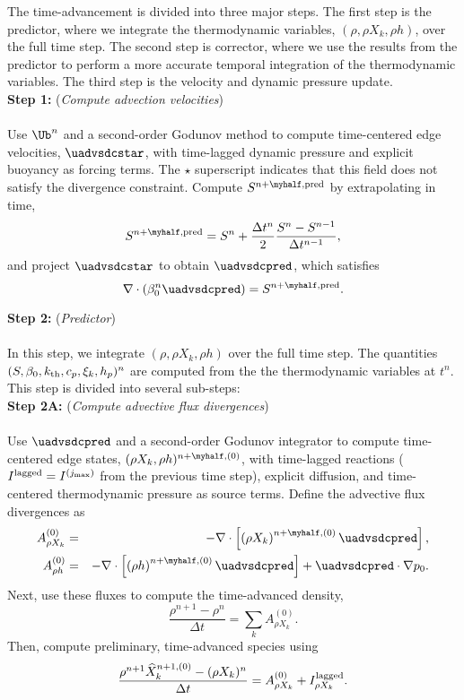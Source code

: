 The time-advancement is divided into three major steps.  The first step is the predictor, where we integrate the thermodynamic variables, $(\rho,\rho X_k,\rho h)$, over the full time step.  The second step is corrector, where we use the results from the predictor to perform a more accurate temporal integration of the thermodynamic variables.  The third step is the velocity and dynamic pressure update.\\

{\bf Step 1:} ({\it Compute advection velocities})\\ \\
Use $\Ub^n$ and a second-order Godunov method to compute time-centered edge velocities, $\uadvsdcstar$, with time-lagged dynamic pressure and explicit buoyancy as forcing terms.  The $\star$ superscript indicates that this field does not satisfy the divergence constraint.  Compute $S^{n+\myhalf,{\rm pred}}$ by extrapolating in time,
\begin{equation}
S^{n+\myhalf,{\rm pred}} = S^n + \frac{\Delta t^n}{2}\frac{S^n - S^{n-1}}{\Delta t^{n-1}},
\end{equation}
and project $\uadvsdcstar$ to obtain $\uadvsdcpred$, which satisfies
\begin{equation}
\nabla\cdot\left(\beta_0^n\uadvsdcpred\right) = S^{n+\myhalf,\rm{pred}}.
\end{equation}

{\bf Step 2:} ({\it Predictor})\\ \\
 In this step, we integrate $(\rho, \rho X_k, \rho h)$ over the full time step.  The quantities $(S, \beta_0, k_{\rm th}, c_p, \xi_k, h_p)^n$ are computed from the the thermodynamic variables at $t^n$.  This step is divided into several sub-steps:\\

{\bf Step 2A:} ({\it Compute advective flux divergences})\\ \\
Use $\uadvsdcpred$ and a second-order Godunov integrator to compute time-centered edge states, $(\rho X_k, \rho h)^{n+\myhalf,(0)}$, with time-lagged reactions ($I^{\rm lagged} = I^{(j_{\rm max})}$ from the previous time step), explicit diffusion, and time-centered thermodynamic pressure as source terms.  Define the advective flux divergences as
\begin{eqnarray}
A_{\rho X_k}^{(0)} &=& -\nabla\cdot\left[\left(\rho X_k\right)^{n+\myhalf,{(0)}}\uadvsdcpred\right],\\
A_{\rho h}^{(0)} &=& -\nabla\cdot\left[\left(\rho h\right)^{n+\myhalf,(0)}\uadvsdcpred\right] + \uadvsdcpred\cdot\nabla p_0.
\end{eqnarray}
Next, use these fluxes to compute the time-advanced density,
\begin{equation}
\frac{\rho^{n+1} - \rho^n}{\Delta t} = \sum_k A_{\rho X_k}^{(0)}.
\end{equation}
Then, compute preliminary, time-advanced species using
\begin{equation}
\frac{\rho^{n+1}\widehat{X}_k^{n+1,(0)} - (\rho X_k)^n}{\Delta t} = A_{\rho X_k}^{(0)} + I_{\rho X_k}^{\rm lagged}.\label{eq:sdc species 2}
\end{equation}


